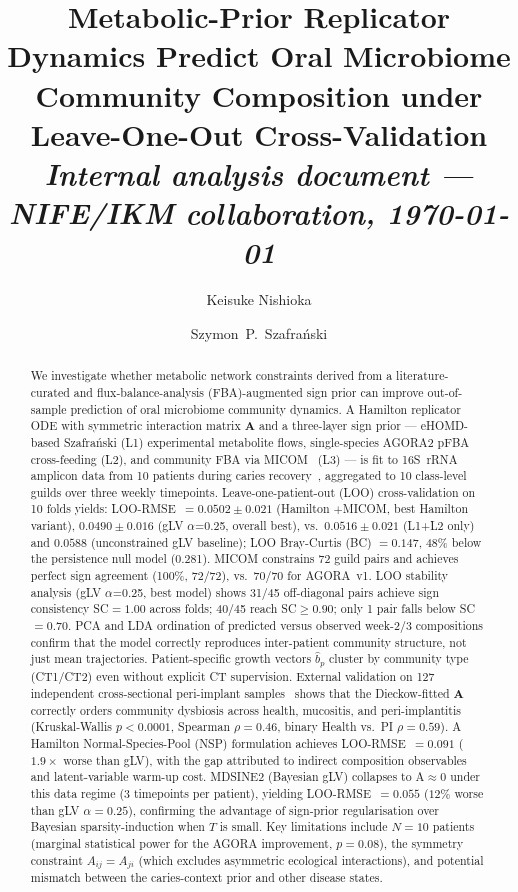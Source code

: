 \documentclass[11pt,a4paper]{article}
\title{\textbf{Metabolic-Prior Replicator Dynamics Predict Oral Microbiome\\
Community Composition under Leave-One-Out Cross-Validation}\\[6pt]
\large \textit{Internal analysis document — NIFE/IKM collaboration, \today}}
\author[1,3]{Keisuke Nishioka}
\author[2,3]{Szymon~P.~Szafra\'{n}ski}
\affil[1]{Institut f\"ur Kontinuumsmechanik (IKM), Leibniz Universit\"at Hannover, Hannover, Germany}
\affil[2]{Department of Prosthetic Dentistry and Biomedical Materials Science,
          Hannover Medical School (MHH), Hannover, Germany}
\affil[3]{Lower Saxony Centre for Biomedical Engineering, Implant Research and Development (NIFE), Hannover, Germany}
\date{}
\newcommand{\bA}{\mathbf{A}}
\begin{document}
\maketitle

\begin{abstract}
\noindent
We investigate whether metabolic network constraints derived from a literature-curated
and flux-balance-analysis (FBA)-augmented sign prior can improve out-of-sample prediction
of oral microbiome community dynamics.
A Hamilton replicator ODE with symmetric interaction matrix $\bA$ and a three-layer
sign prior — eHOMD-based Szafra\'{n}ski (L1) experimental metabolite flows,
single-species AGORA2 pFBA cross-feeding (L2), and community FBA via
MICOM~\citep{diener2020} (L3) — is fit to 16S~rRNA amplicon data from
10 patients during caries recovery~\citep{dieckow2024}, aggregated to 10 class-level
guilds over three weekly timepoints.
Leave-one-patient-out (LOO) cross-validation on 10 folds yields:
LOO-RMSE~$= 0.0502 \pm 0.021$ (Hamilton $+$MICOM, best Hamilton variant),
$0.0490 \pm 0.016$ (gLV $\alpha$=0.25, overall best), vs.\ $0.0516 \pm 0.021$
(L1+L2 only) and $0.0588$ (unconstrained gLV baseline);
LOO Bray-Curtis (BC) $= 0.147$, 48\% below the persistence null model (0.281).
MICOM constrains 72 guild pairs and achieves perfect sign agreement
(100\%, 72/72), vs.\ 70/70 for AGORA~v1.
LOO stability analysis (gLV $\alpha$=0.25, best model) shows 31/45 off-diagonal
pairs achieve sign consistency SC$=1.00$ across folds; 40/45 reach SC$\geq 0.90$;
only 1 pair falls below SC$=0.70$.
PCA and LDA ordination of predicted versus observed week-2/3 compositions confirm
that the model correctly reproduces inter-patient community structure, not just mean
trajectories.
Patient-specific growth vectors $\hat{b}_p$ cluster by community type (CT1/CT2)
even without explicit CT supervision.
External validation on 127 independent cross-sectional peri-implant samples~\citep{szafranski2025}
shows that the Dieckow-fitted $\bA$ correctly orders community dysbiosis across health,
mucositis, and peri-implantitis (Kruskal-Wallis $p<0.0001$, Spearman $\rho=0.46$,
binary Health vs.\ PI $\rho=0.59$).
A Hamilton Normal-Species-Pool (NSP) formulation achieves LOO-RMSE~$=0.091$
($1.9\times$ worse than gLV), with the gap attributed to indirect composition
observables and latent-variable warm-up cost.
MDSINE2 (Bayesian gLV) collapses to A$\approx$0 under this data regime
(3 timepoints per patient), yielding LOO-RMSE~$=0.055$ ($12\%$ worse than
gLV $\alpha{=}0.25$), confirming the advantage of sign-prior regularisation
over Bayesian sparsity-induction when $T$ is small.
Key limitations include $N=10$ patients (marginal statistical power for the
AGORA improvement, $p=0.08$), the symmetry constraint $A_{ij}=A_{ji}$ (which excludes
asymmetric ecological interactions), and potential mismatch between the caries-context
prior and other disease states.
\end{abstract}
\end{document}
